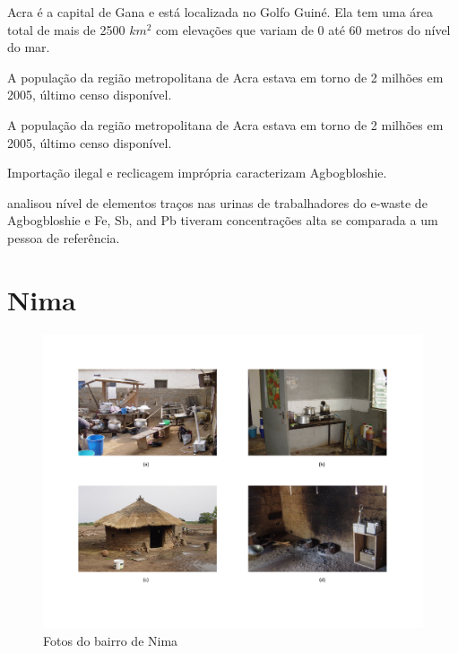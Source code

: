 Acra é a capital  de Gana e está localizada no Golfo Guiné. Ela tem uma área 
total de mais de 2500 $km^2$ com elevações que variam de 0 até 60 metros do nível 
do mar. 

A população da região metropolitana de Acra estava em torno de 2 milhões em 2005, 
último censo disponível.


A população da região metropolitana de Acra estava em torno de 2 milhões em 2005, 
último censo disponível.

Importação ilegal e reclicagem imprópria caracterizam Agbogbloshie.

\cite{asante2012} analisou nível de elementos traços nas urinas de trabalhadores 
do e-waste de Agbogbloshie e Fe, Sb, and Pb tiveram concentrações alta se comparada
a um pessoa de referência. 

\section{Nima}

\begin{figure}[H]
  \caption{Fotos do bairro de Nima}
  \includegraphics[scale=0.35]{../inputs/images/zheng/nima.pdf}
\end{figure}


